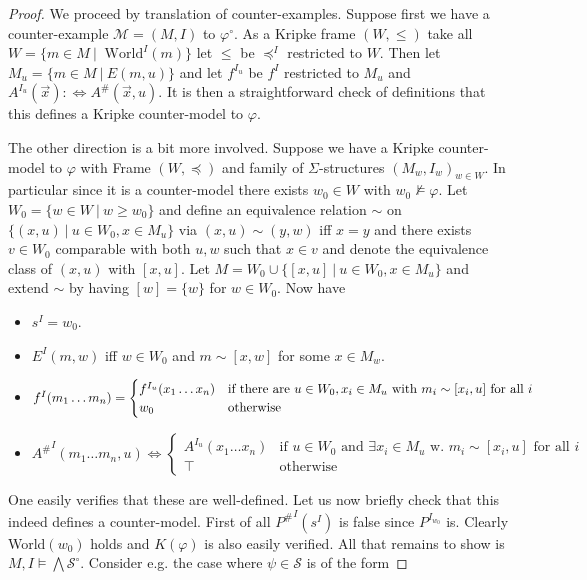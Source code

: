 \documentclass[a4paper,UKenglish,cleveref, autoref, thm-restate]{lipics-v2021}
\begin{document}
\begin{proof}
	We proceed by translation of counter-examples. Suppose first we have a counter-example $\mathcal M = (M, I)$ to $\varphi^\circ$. As a Kripke frame $(W, \leq)$ take all $ W = \{m\in M\:|\:\text{ World}^I(m)\}$ let $\leq$ be $\preceq^I$ restricted to $W$. Then let $M_u = \{m\in M\:|\: E(m, u)\}$ and let $f^{I_u}$ be $f^I$ restricted to $M_u$ and $A^{I_u}(\vec x): \Leftrightarrow A^\#(\vec x, u)$. It is then a straightforward check of definitions that this defines a Kripke counter-model to $\varphi$.
	
	The other direction is a bit more involved. Suppose we have a Kripke counter-model to $\varphi$ with Frame $(W, \preceq)$ and family of $\Sigma$-structures $(M_w, I_w)_{w\in W}$. In particular since it is a counter-model there exists $w_0\in W$ with $w_0\not\models\varphi$. Let $W_0 = \{w\in W\:|\: w\geq w_0\}$ and define an equivalence relation $\sim$ on $\{(x, u)\:|\:u\in W_0, x\in M_u\}$ via $(x, u)\sim (y, w)$ iff $x = y$ and there exists $v\in W_0$ comparable with both $u, w$ such that $x\in v$ and denote the equivalence class of $(x, u)$ with $[x, u]$. Let $M = W_0\cup \{[x, u]\:|\:u\in W_0, x\in M_u\}$ and extend $\sim$ by having $[w] = \{w\}$ for $w\in W_0$. Now have
	\begin{itemize}
		\item $s^I = w_0$.
		\item $E^I(m, w)$ iff $w\in W_0$ and $m \sim [x, w]$ for some $x\in M_w$.
		\item $f^I(m_1\dots m_n) =\begin{cases}
			 f^{I_u}(x_1\dots x_n) &\text{if there are $ u\in W_0, x_i\in M_u$ with $m_i\sim [x_i, u]$ for all $i$}\\
			 w_0 & \text{otherwise}
		\end{cases}$
		\item ${A^\#}^I(m_1\dots m_n, u) \Leftrightarrow\begin{cases}
			A^{I_u}(x_1\dots x_n) &\text{if $u\in W_0$ and $\exists x_i\in M_u$ w. $m_i\sim [x_i, u]$ for all $i$}\\
			\top & \text{otherwise}
		\end{cases}$
	\end{itemize}
	One easily verifies that these are well-defined. Let us now briefly check that this indeed defines a counter-model. First of all ${P^\#}^I(s^I)$ is false since $P^{I_{w_0}}$ is. Clearly World$(w_0)$ holds and $K(\varphi)$ is also easily verified. All that remains to show is $M, I\models\bigwedge\mathcal S^\circ$. Consider e.g. the case where $\psi\in\mathcal S$ is of the form

\end{proof}
\end{document}
